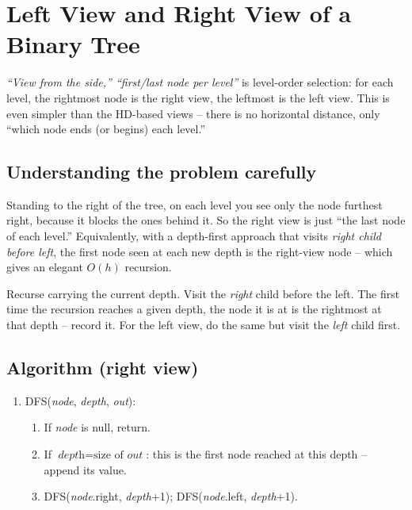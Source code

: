 \section{Left View and Right View of a Binary Tree}
\label{sec:trees-left-right-view}


\begin{patternbox}
\emph{``View from the side,'' ``first/last node per level''} is level-order
selection: for each level, the rightmost node is the right view, the
leftmost is the left view. This is even simpler than the HD-based views --
there is no horizontal distance, only ``which node ends (or begins) each
level.''
\end{patternbox}

\subsection*{Understanding the problem carefully}

Standing to the right of the tree, on each level you see only the node
furthest right, because it blocks the ones behind it. So the right view is
just ``the last node of each level.'' Equivalently, with a depth-first
approach that visits \emph{right child before left}, the first node seen
at each new depth is the right-view node -- which gives an elegant $O(h)$
recursion.

\begin{ideabox}
Recurse carrying the current depth. Visit the \emph{right} child before
the left. The first time the recursion reaches a given depth, the node it
is at is the rightmost at that depth -- record it. For the left view, do
the same but visit the \emph{left} child first.
\end{ideabox}

\subsection*{Algorithm (right view)}

\begin{enumerate}
  \item \textsc{DFS}(\textit{node}, \textit{depth}, \textit{out}):
  \begin{enumerate}
    \item If \textit{node} is null, return.
    \item If $\textit{depth} = \text{size of } \textit{out}$: this is the
          first node reached at this depth -- append its value.
    \item \textsc{DFS}(\textit{node}.right, \textit{depth}+1);
          \textsc{DFS}(\textit{node}.left, \textit{depth}+1).
  \end{enumerate}
\end{enumerate}

